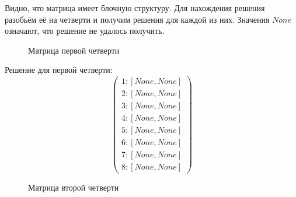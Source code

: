 \documentclass{article}
\begin{document}
Видно, что матрица имеет блочную структуру. Для нахождения решения разобьём её на четверти и получим решения для каждой из них. Значения $None$ означают, что решение не удалось получить.

\newpage

\begin{figure}[h]
\caption{Матрица первой четверти}
\label{fig:image}
\end{figure}

Решение для первой четверти:
\begin{equation*}
\begin{pmatrix}
1 : [ None , None ] \\
2 : [ None , None ] \\
3 : [ None , None ] \\
4 : [ None , None ] \\ 
5 : [ None , None ] \\ 
6 : [ None , None ] \\ 
7 : [ None , None ] \\
8 : [ None , None ]
\end{pmatrix}
\end{equation*}

\begin{figure}[h]
\caption{Матрица второй четверти}
\label{fig:image}
\end{figure}
\end{document}
